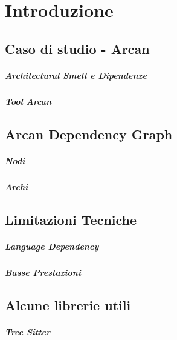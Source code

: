 \chapter{Introduzione}

\section{Caso di studio - Arcan}

\paragraph{Architectural Smell e Dipendenze}

\paragraph{Tool Arcan}

\section{Arcan Dependency Graph}

\paragraph{Nodi}

\paragraph{Archi}

\section{Limitazioni Tecniche}

\paragraph{Language Dependency}

\paragraph{Basse Prestazioni}

\section{Alcune librerie utili}

\paragraph{Tree Sitter}

